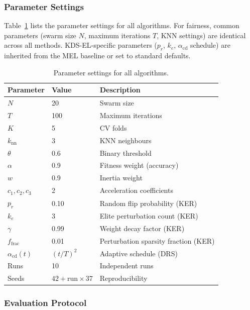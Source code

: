 \documentclass[a4paper,fleqn]{cas-dc}
\begin{document}
\begin{sloppypar}
	\subsubsection{Parameter Settings}
	\label{sec:experiments:params}

	\par{
	Table~\ref{tab:params} lists the parameter settings for all
	algorithms.
	For fairness, common parameters (swarm size $N$, maximum iterations
	$T$, KNN settings) are identical across all methods.
	KDS-EL-specific parameters ($p_r$, $k_e$, $\alpha_{\mathrm{cd}}$
	schedule) are inherited from the MEL baseline or set to standard
	defaults.
	}

	\begin{table}[t]
	\centering
	\caption{Parameter settings for all algorithms.}
	\label{tab:params}
	\setlength{\tabcolsep}{4pt}
	\begin{tabular}{lll}
	\toprule
	\textbf{Parameter} & \textbf{Value} & \textbf{Description} \\
	\midrule
	$N$          & 20    & Swarm size \\
	$T$          & 100   & Maximum iterations \\
	$K$          & 5     & CV folds \\
	$k_{\mathrm{nn}}$ & 3  & KNN neighbours \\
	$\theta$     & 0.6   & Binary threshold \\
	$\alpha$     & 0.9   & Fitness weight (accuracy) \\
	$w$          & 0.9   & Inertia weight \\
	$c_1, c_2, c_3$ & 2  & Acceleration coefficients \\
	$p_r$        & 0.10  & Random flip probability (KER) \\
	$k_e$        & 3     & Elite perturbation count (KER) \\
	$\gamma$     & 0.99  & Weight decay factor (KER) \\
	$f_{\mathrm{frac}}$ & 0.01 & Perturbation sparsity fraction (KER) \\
	$\alpha_{\mathrm{cd}}(t)$ & $(t/T)^2$ & Adaptive schedule (DRS) \\
	Runs         & 10    & Independent runs \\
	Seeds        & $42 + \text{run} \times 37$ & Reproducibility \\
	\bottomrule
	\end{tabular}
	\end{table}


	\subsubsection{Evaluation Protocol}
	\label{sec:experiments:protocol}


\end{sloppypar}
\end{document}
